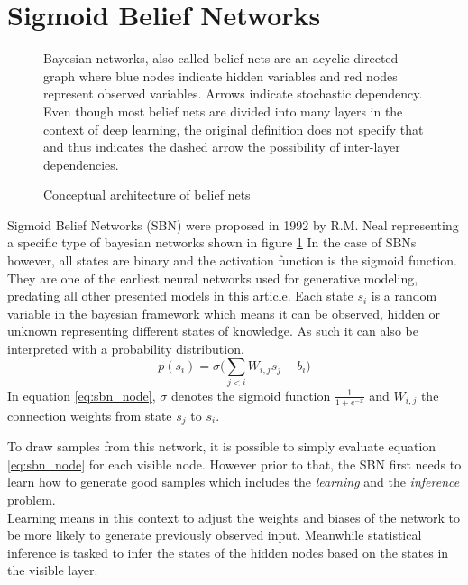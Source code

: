 \section{Sigmoid Belief Networks}
\label{sec:sbn}
\begin{figure}[htb]
\centering

  \caption{Conceptual architecture of belief nets}
  \label{fig:sbn_arch}
  \medskip
  \small
  Bayesian networks, also called belief nets are an acyclic directed graph where blue nodes indicate hidden variables and red nodes represent observed variables.
  Arrows indicate stochastic dependency.
  Even though most belief nets are divided into many layers in the context of deep learning, the original definition does not specify that and thus indicates the dashed arrow the possibility of inter-layer dependencies.
\end{figure}

Sigmoid Belief Networks (SBN) were proposed in 1992 by R.M. Neal \cite{neal:1992} representing a specific type of bayesian networks \cite{pearl:1985} shown in figure \ref{fig:sbn_arch}
In the case of SBNs however, all states are binary and the activation function is the sigmoid function. They are one of the earliest neural networks used for generative modeling, predating all other presented models in this article.
Each state $s_i$ is a random variable in the bayesian framework which means it can be observed, hidden or unknown representing different states of knowledge. As such it can also be interpreted with a probability distribution.
\begin{equation}
  \label{eq:sbn_node}
p(s_i) = \sigma\bigg(\sum_{j<i}W_{i,j}s_j+b_i\bigg)
\end{equation}
In equation \ref{eq:sbn_node}, $\sigma$ denotes the sigmoid function $\frac{1}{1 + e^{-x}}$ and $W_{i,j}$ the connection weights from state $s_j$ to $s_i$.

To draw samples from this network, it is possible to simply evaluate equation \ref{eq:sbn_node} for each visible node.
However prior to that, the SBN first needs to learn how to generate good samples which includes the \emph{learning} and the \emph{inference} problem.\\
Learning means in this context to adjust the weights and biases of the network to be more likely to generate previously observed input.
Meanwhile statistical inference is tasked to infer the states of the hidden nodes based on the states in the visible layer.\\


